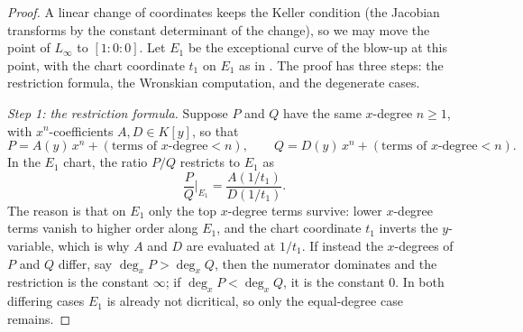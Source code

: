\documentclass[a4paper,11pt]{article}
\newcommand{\filename}[1]{\texttt{\seqsplit{#1}}}
\theoremstyle{plain}
\theoremstyle{definition}
\theoremstyle{remark}
\begin{document}
\begin{proof}
A linear change of coordinates keeps the Keller condition (the Jacobian transforms by the
constant determinant of the change), so we may move the point of $L_\infty$ to
$[1 : 0 : 0]$. Let $E_1$ be the exceptional curve of the blow-up at this point, with the
chart coordinate $t_1$ on $E_1$ as in \filename{lean/check\_e1\_index.py}. The proof has three
steps: the restriction formula, the Wronskian computation, and the degenerate cases.

\emph{Step 1: the restriction formula.} Suppose $P$ and $Q$ have the same $x$-degree
$n \geq 1$, with $x^n$-coefficients $A, D \in K[y]$, so that
\begin{equation}\label{td:eq:lead-expansion}
P = A(y)\, x^n + (\text{terms of $x$-degree} < n), \qquad
Q = D(y)\, x^n + (\text{terms of $x$-degree} < n).
\end{equation}
In the $E_1$ chart, the ratio $P/Q$ restricts to $E_1$ as
\begin{equation}\label{td:eq:e1-restriction}
\frac{P}{Q}\bigg|_{E_1} = \frac{A(1/t_1)}{D(1/t_1)}.
\end{equation}
The reason is that on $E_1$ only the top $x$-degree terms survive: lower $x$-degree terms
vanish to higher order along $E_1$, and the chart coordinate $t_1$ inverts the $y$-variable,
which is why $A$ and $D$ are evaluated at $1/t_1$. If instead the $x$-degrees of $P$ and $Q$
differ, say $\deg_x P > \deg_x Q$, then the numerator dominates and the restriction is the
constant $\infty$; if $\deg_x P < \deg_x Q$, it is the constant $0$. In both differing cases
$E_1$ is already not dicritical, so only the equal-degree case remains.


\end{proof}
\end{document}
